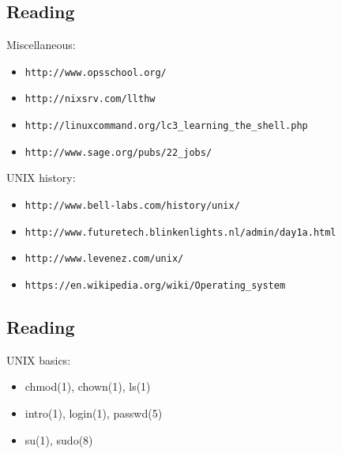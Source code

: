 \documentclass[xga]{xdvislides}
\begin{document}
\subsection{Reading}
Miscellaneous:
\begin{itemize}
	\item \verb+http://www.opsschool.org/+
	\item \verb+http://nixsrv.com/llthw+
	\item \verb+http://linuxcommand.org/lc3_learning_the_shell.php+
	\item \verb+http://www.sage.org/pubs/22_jobs/+
\end{itemize}

UNIX history:
\begin{itemize}
	\item \verb+http://www.bell-labs.com/history/unix/+
	\item \verb+http://www.futuretech.blinkenlights.nl/admin/day1a.html+
	\item \verb+http://www.levenez.com/unix/+
	\item \verb+https://en.wikipedia.org/wiki/Operating_system+
\end{itemize}

\subsection{Reading}
UNIX basics:
\begin{itemize}
	\item chmod(1), chown(1), ls(1)
	\item intro(1), login(1), passwd(5)
	\item su(1), sudo(8)
\end{itemize}

%
%
\end{document}
